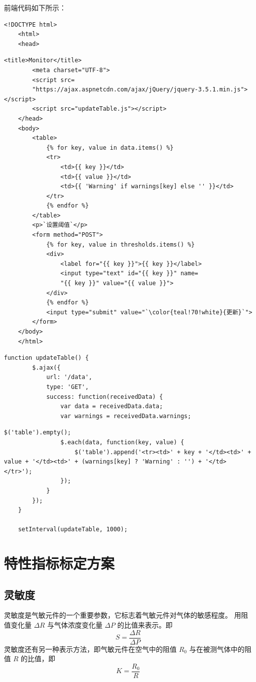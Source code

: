 \documentclass[12pt,hyperref,a4paper,UTF8]{ctexart}
\begin{document}
前端代码如下所示：
\begin{lstlisting}[style=htmlstyle, name=home.html, title={home.html}]
    <!DOCTYPE html>
    <html>
    <head>
\end{lstlisting}
\newpage
\begin{lstlisting}[style=htmlstyle, name=home.html]
        <title>Monitor</title>
        <meta charset="UTF-8">
        <script src=
        "https://ajax.aspnetcdn.com/ajax/jQuery/jquery-3.5.1.min.js"></script>
        <script src="updateTable.js"></script>
    </head>
    <body>
        <table>
            {% for key, value in data.items() %}
            <tr>
                <td>{{ key }}</td>
                <td>{{ value }}</td>
                <td>{{ 'Warning' if warnings[key] else '' }}</td>
            </tr>
            {% endfor %}
        </table>
        <p>`设置阈值`</p>
        <form method="POST">
            {% for key, value in thresholds.items() %}
            <div>
                <label for="{{ key }}">{{ key }}</label>
                <input type="text" id="{{ key }}" name=
                "{{ key }}" value="{{ value }}">
            </div>
            {% endfor %}
            <input type="submit" value="`\color{teal!70!white}{更新}`">
        </form>
    </body>
    </html>
\end{lstlisting}

\begin{lstlisting}[style=jsstyle, name=updateTable.js, title={updateTable.js}]
    function updateTable() {
        $.ajax({
            url: '/data', 
            type: 'GET',
            success: function(receivedData) {
                var data = receivedData.data;
                var warnings = receivedData.warnings;
\end{lstlisting}
\begin{lstlisting}[style=jsstyle, name=updateTable.js]
                $('table').empty();
                $.each(data, function(key, value) {
                    $('table').append('<tr><td>' + key + '</td><td>' + value + '</td><td>' + (warnings[key] ? 'Warning' : '') + '</td></tr>');
                });
            }
        });
    }

    setInterval(updateTable, 1000);
\end{lstlisting}

\section{特性指标标定方案}
\subsection{灵敏度}
灵敏度是气敏元件的一个重要参数，它标志着气敏元件对气体的敏感程度。
用阻值变化量 $\Delta R$ 与气体浓度变化量 $\Delta P$ 的比值来表示。即
\begin{equation}
    S = \frac{\Delta R}{\Delta P}
\end{equation}
灵敏度还有另一种表示方法，即气敏元件在空气中的阻值 $R_0$ 与在被测气体中的阻值 $R$ 的比值，即
\begin{equation}
    K = \frac{R_0}{R}
\end{equation}
\end{document}
